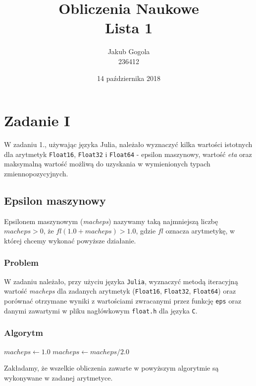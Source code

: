 \documentclass{article}
\title{\textbf{Obliczenia Naukowe}
\\\large Lista 1 }
\author{Jakub Gogola
\\236412}
\date{14 października 2018}
\begin{document}
\maketitle
\section{Zadanie I}
W zadaniu 1., używając języka Julia, należało wyznaczyć kilka wartości istotnych dla arytmetyk \texttt{Float16}, \texttt{Float32} i \texttt{Float64} - epsilon maszynowy, wartość \textit{eta}  oraz maksymalną wartość możliwą do uzyskania w wymienionych typach zmiennopozycyjnych.

\subsection{Epsilon maszynowy}
Epsilonem maszynowym (\textit{macheps}) nazywamy taką najmniejszą liczbę $macheps > 0$, że $fl(1.0 + macheps) > 1.0$, gdzie $fl$ oznacza arytmetykę, w której chcemy wykonać powyższe działanie.

\subsubsection{Problem}
W zadaniu należało, przy użyciu języka \texttt{Julia}, wyznaczyć metodą iteracyjną wartość \textit{macheps} dla zadanych arytmetyk (\texttt{Float16}, \texttt{Float32}, \texttt{Float64}) oraz porównać otrzymane wyniki z wartościami zwracanymi przez funkcję \texttt{eps} oraz danymi zawartymi w pliku nagłówkowym \texttt{float.h} dla języka \texttt{C}.

\subsubsection{Algorytm}
\begin{algorithm}
\begin{algorithmic}[1]
        \State $macheps \gets 1.0$
            \State $macheps \gets macheps / 2.0$
        \EndWhile        
        \State {}
    \EndFunction
\end{algorithmic}
\end{algorithm}
Zakładamy, że wszelkie obliczenia zawarte w powyższym algorytmie są wykonywane w zadanej arytmetyce.
\end{document}

